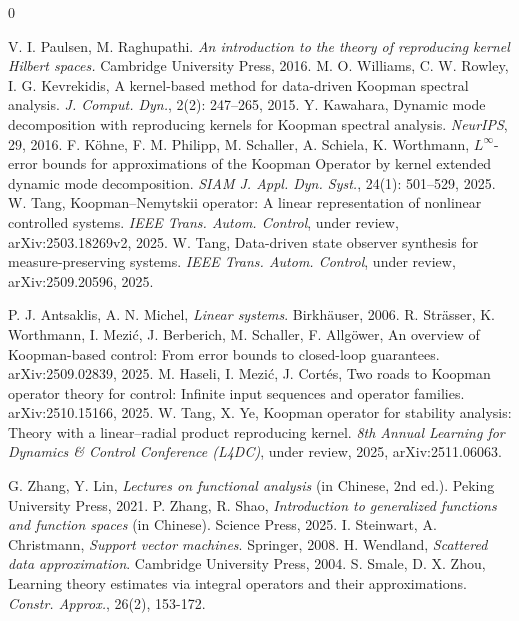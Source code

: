 \documentclass[english]{cccconf}
\renewcommand{\emph}[1]{\textit{#1}}
\begin{document}
\begin{thebibliography}{0}
\begin{scriptsize}
V. I. Paulsen, M. Raghupathi. \emph{An introduction to the theory of reproducing kernel Hilbert spaces.} Cambridge University Press, 2016. 
M. O. Williams, C. W. Rowley, I. G. Kevrekidis, A kernel-based method for data-driven Koopman spectral analysis. \emph{J. Comput. Dyn.}, 2(2): 247--265, 2015.
Y. Kawahara, Dynamic mode decomposition with reproducing kernels for Koopman spectral analysis. \emph{NeurIPS}, 29, 2016.
F. K{\"{o}}hne, F. M. Philipp, M. Schaller, A. Schiela, K. Worthmann, $L^\infty$-error bounds for approximations of the Koopman Operator by kernel extended dynamic mode decomposition. \emph{SIAM J. Appl. Dyn. Syst.}, 24(1): 501--529, 2025. 
W. Tang, Koopman--Nemytskii operator: A linear representation of nonlinear controlled systems. \emph{IEEE Trans. Autom. Control}, under review, arXiv:2503.18269v2, 2025. 
W. Tang, Data-driven state observer synthesis for measure-preserving systems. \emph{IEEE Trans. Autom. Control}, under review, arXiv:2509.20596, 2025. 

P. J. Antsaklis, A. N. Michel, \emph{Linear systems}. Birkh{\"{a}}user, 2006.
R. Str{\"{a}}sser, K. Worthmann, I. Mezi{\'{c}}, J. Berberich, M. Schaller, F. Allg\"{o}wer, An overview of Koopman-based control: From error bounds to closed-loop guarantees. arXiv:2509.02839, 2025.
M. Haseli, I. Mezi{\'{c}}, J. Cort{\'{e}}s, Two roads to Koopman operator theory for control: Infinite input sequences and operator families. arXiv:2510.15166, 2025.
W. Tang, X. Ye, Koopman operator for stability analysis: Theory with a linear--radial product reproducing kernel. \emph{8th Annual Learning for Dynamics \& Control Conference (L4DC)}, under review, 2025, arXiv:2511.06063.

G. Zhang, Y. Lin, \emph{Lectures on functional analysis} (in Chinese, 2nd ed.). Peking University Press, 2021. 
P. Zhang, R. Shao, \emph{Introduction to generalized functions and function spaces} (in Chinese). Science Press, 2025. 
I. Steinwart, A. Christmann, \emph{Support vector machines}. Springer, 2008.
H. Wendland, \emph{Scattered data approximation}. Cambridge University Press, 2004.
S. Smale, D. X. Zhou, Learning theory estimates via integral operators and their approximations. \emph{Constr. Approx.}, 26(2), 153-172.

\end{scriptsize}
\end{thebibliography}
\end{document}
